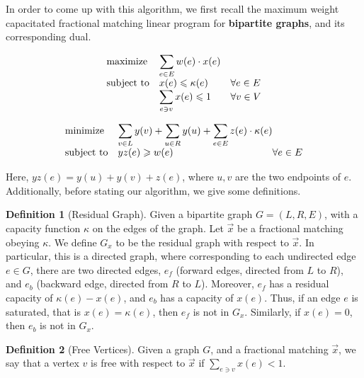\documentclass[a4paper,11pt]{article}
\theoremstyle{definition}
\newtheorem{definition2}{Definition}
\theoremstyle{definition}
\theoremstyle{definition}
\theoremstyle{definition}
\theoremstyle{definition}
\theoremstyle{definition}
\theoremstyle{definition}
\theoremstyle{definition}
\theoremstyle{definition}
\theoremstyle{definition}
\theoremstyle{definition}
\theoremstyle{definition}
\theoremstyle{definition}
\theoremstyle{definition}
\theoremstyle{definition}
\begin{document}
In order to come up with this algorithm, we first recall the maximum weight capacitated fractional matching linear program for \textbf{bipartite graphs}, and its corresponding dual.

\begin{equation}
\begin{array}{ll@{}ll}
\text{maximize}  & \displaystyle\sum\limits_{e\in E} w(e)\cdot x(e)  \\
\text{subject to}& \displaystyle x(e)\leqslant \kappa(e)& & \forall e\in E \\
& \displaystyle \sum_{e\ni v} x(e) \leqslant 1 & & \forall v\in V
\end{array}
\end{equation}

\begin{equation}
\begin{array}{ll@{}ll}
\text{minimize}  & \displaystyle\sum\limits_{v\in L} y(v) +\sum\limits_{u\in R} y(u) +\sum_{e\in E} z(e)\cdot \kappa(e) &  \\
\text{subject to}& \displaystyle yz(e)\geqslant w(e) &  \forall e\in E 
\end{array}
\end{equation}

Here, $yz(e)=y(u)+y(v)+z(e)$, where $u,v$ are the two endpoints of $e$. Additionally, before stating our algorithm, we give some definitions.

\begin{definition2}[Residual Graph]
Given a bipartite graph $G=(L,R,E)$, with a capacity function $\kappa$ on the edges of the graph. Let $\vec{x}$ be a fractional matching obeying $\kappa$. We define $G_x$ to be the residual graph with respect to $\vec{x}$. In particular, this is a directed graph, where corresponding to each undirected edge $e\in G$, there are two directed edges, $e_f$ (forward edges, directed from $L$ to $R$), and $e_b$ (backward edge, directed from $R$ to $L$). Moreover, $e_f$ has a residual capacity of $\kappa(e)-x(e)$, and $e_b$ has a capacity of $x(e)$. Thus, if an edge $e$ is saturated, that is $x(e)=\kappa(e)$, then $e_f$ is not in $G_x$. Similarly, if $x(e)=0$, then $e_b$ is not in $G_x$.  
\end{definition2}

\begin{definition2}[Free Vertices]
Given a graph $G$, and a fractional matching $\vec{x}$, we say that a vertex $v$ is free with respect to $\vec{x}$ if $\sum_{e\ni v}x(e)<1$.
\end{definition2}
\end{document}
